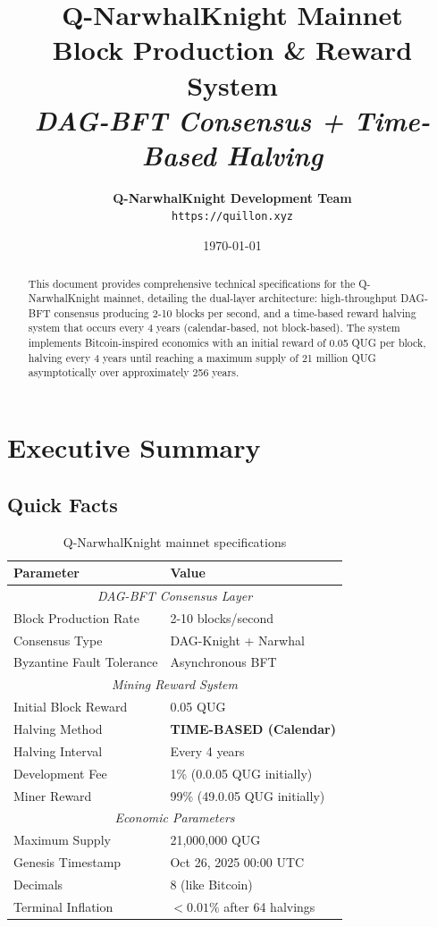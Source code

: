 \documentclass[11pt,a4paper]{article}
\title{
    \Huge\textbf{Q-NarwhalKnight Mainnet} \\
    \vspace{0.3cm}
    \Large Block Production \& Reward System \\
    \vspace{0.5cm}
    \large\textit{DAG-BFT Consensus + Time-Based Halving}
}
\author{
    \textbf{Q-NarwhalKnight Development Team} \\
    \texttt{https://quillon.xyz}
}
\date{\today}
\begin{document}
\maketitle

\begin{abstract}
This document provides comprehensive technical specifications for the Q-NarwhalKnight mainnet, detailing the dual-layer architecture: high-throughput DAG-BFT consensus producing 2-10 blocks per second, and a time-based reward halving system that occurs every 4 years (calendar-based, not block-based). The system implements Bitcoin-inspired economics with an initial reward of 0.05 QUG per block, halving every 4 years until reaching a maximum supply of 21 million QUG asymptotically over approximately 256 years.
\end{abstract}

\tableofcontents
\newpage

\section{Executive Summary}

\subsection{Quick Facts}

\begin{table}[h]
\centering
\begin{tabular}{ll}
\toprule
\textbf{Parameter} & \textbf{Value} \\
\midrule
\multicolumn{2}{c}{\textit{DAG-BFT Consensus Layer}} \\
\midrule
Block Production Rate & 2-10 blocks/second \\
Consensus Type & DAG-Knight + Narwhal \\
Byzantine Fault Tolerance & Asynchronous BFT \\
\midrule
\multicolumn{2}{c}{\textit{Mining Reward System}} \\
\midrule
Initial Block Reward & 0.05 QUG \\
Halving Method & \textbf{TIME-BASED (Calendar)} \\
Halving Interval & Every 4 years \\
Development Fee & 1\% (0.0.05 QUG initially) \\
Miner Reward & 99\% (49.0.05 QUG initially) \\
\midrule
\multicolumn{2}{c}{\textit{Economic Parameters}} \\
\midrule
Maximum Supply & 21,000,000 QUG \\
Genesis Timestamp & Oct 26, 2025 00:00 UTC \\
Decimals & 8 (like Bitcoin) \\
Terminal Inflation & $<0.01\%$ after 64 halvings \\
\bottomrule
\end{tabular}
\caption{Q-NarwhalKnight mainnet specifications}
\end{table}
\end{document}
